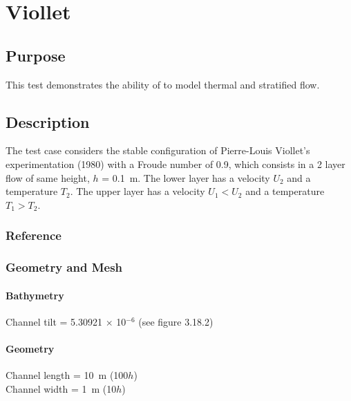 \chapter{Viollet}
%
%
\section{Purpose}
%
This test demonstrates the ability of  to model thermal and stratified flow.
%
\section{Description}
%
The test case considers the stable configuration of Pierre-Louis Viollet’s experimentation
(1980) with a Froude number of 0.9, which consists in a 2 layer flow of same height,
$h$ = 0.1~m.
The lower layer has a velocity $U_2$ and a temperature $T_2$.
The upper layer has a velocity $U_1 < U_2$ and a temperature $T_1 > T_2$.
%
%
%
%
\subsection{Reference}
%

%
%
%
\subsection{Geometry and Mesh}
%
\subsubsection{Bathymetry}
%
Channel tilt = 5.30921 $\times$ 10$^{-6}$ (see figure 3.18.2)
%
\subsubsection{Geometry}
%
Channel length = 10~m (100$h$)\\
Channel width = 1~m (10$h$)
%
